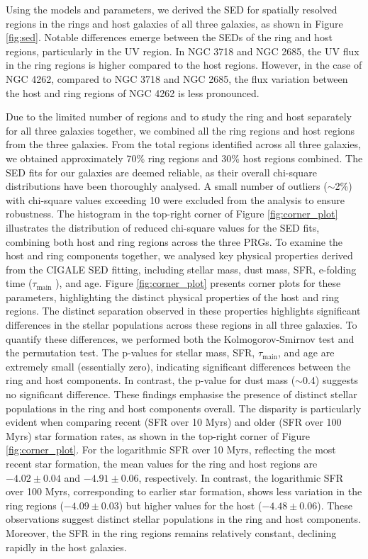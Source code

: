 \documentclass{pas}
\begin{document}
Using the models and parameters, we derived the SED for spatially resolved regions in the rings and host galaxies of all three galaxies, as shown in Figure \ref{fig:sed}. Notable differences emerge between the SEDs of the ring and host regions, particularly in the UV region. In NGC 3718 and NGC 2685, the UV flux in the ring regions is higher compared to the host regions. However, in the case of NGC 4262, compared to NGC 3718 and NGC 2685, the flux variation between the host and ring regions of NGC 4262 is less pronounced. \par
Due to the limited number of regions and to study the ring and host separately for all three galaxies together, we combined all the ring regions and host regions from the three galaxies. From the total regions identified across all three galaxies, we obtained approximately 70\% ring regions and 30\% host regions combined. The SED fits for our galaxies are deemed reliable, as their overall chi-square distributions have been thoroughly analysed. A small number of outliers ($\sim$2\%) with chi-square values exceeding 10 were excluded from the analysis to ensure robustness. The histogram in the top-right corner of Figure \ref{fig:corner_plot} illustrates the distribution of reduced chi-square values for the SED fits, combining both host and ring regions across the three PRGs. To examine the host and ring components together, we analysed key physical properties derived from the CIGALE SED fitting, including stellar mass, dust mass, SFR, e-folding time (\(\tau_{\text{main}}\) ), and age. Figure \ref{fig:corner_plot} presents corner plots for these parameters, highlighting the distinct physical properties of the host and ring regions. The distinct separation observed in these properties highlights significant differences in the stellar populations across these regions in all three galaxies. To quantify these differences, we performed both the Kolmogorov-Smirnov test and the permutation test. The p-values for stellar mass, SFR, \(\tau_{\text{main}}\), and age are extremely small (essentially zero), indicating significant differences between the ring and host components. In contrast, the p-value for dust mass ($\sim$0.4) suggests no significant difference. These findings emphasise the presence of distinct stellar populations in the ring and host components overall.
The disparity is particularly evident when comparing recent (SFR over 10 Myrs) and older (SFR over 100 Myrs) star formation rates, as shown in the top-right corner of Figure \ref{fig:corner_plot}. For the logarithmic SFR over 10 Myrs, reflecting the most recent star formation, the mean values for the ring and host regions are $-4.02 \pm 0.04$ and $-4.91 \pm 0.06$, respectively. In contrast, the logarithmic SFR over 100 Myrs, corresponding to earlier star formation, shows less variation in the ring regions ($-4.09 \pm 0.03$) but higher values for the host ($-4.48 \pm 0.06$). These observations suggest distinct stellar populations in the ring and host components. Moreover, the SFR in the ring regions remains relatively constant, declining rapidly in the host galaxies.
\end{document}
